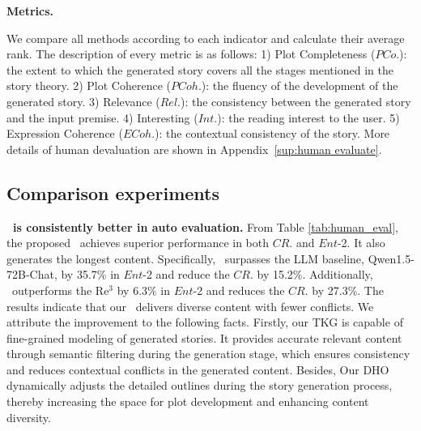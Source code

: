 \textbf{Metrics. }
 \par
{} 
We compare all methods according to each indicator and calculate their average rank. The description of every metric is as follows: 
    1) Plot Completeness ($PCo.$): the extent to which the generated story covers all the stages mentioned in the story theory.
    2)  Plot Coherence ($PCoh.$): the fluency of the development of the generated story.
    3)  Relevance ($Rel.$): the consistency between the generated story and the input premise. 
    4)  Interesting ($Int.$): the reading interest to the user. 
    5)  Expression Coherence ($ECoh.$): the contextual consistency of the story.
More details of human devaluation are shown in Appendix~\ref{sup:human evaluate}.

\subsection{Comparison experiments}

\textbf{\methodname~is consistently better in auto evaluation.} From Table \ref{tab:human_eval}, the proposed \methodname~achieves superior performance in both $CR.$ and $Ent$-2. It also generates the longest content.
Specifically, \methodname~surpasses the LLM baseline, Qwen1.5-72B-Chat, by 35.7\% in $Ent$-2 and reduce the $CR.$ by 15.2\%. Additionally, \methodname~outperforms the Re$^3$ by 6.3\% in $Ent$-2 and reduces the $CR.$ by 27.3\%. The results indicate that our \methodname~delivers diverse content with fewer conflicts. We attribute the improvement to the following facts. Firstly, our TKG is capable of fine-grained modeling of generated stories. It provides accurate relevant content through semantic filtering during the generation stage, which ensures consistency and reduces contextual conflicts in the generated content. Besides, Our DHO dynamically adjusts the detailed outlines during the story generation process, thereby increasing the space for plot development and enhancing content diversity.


